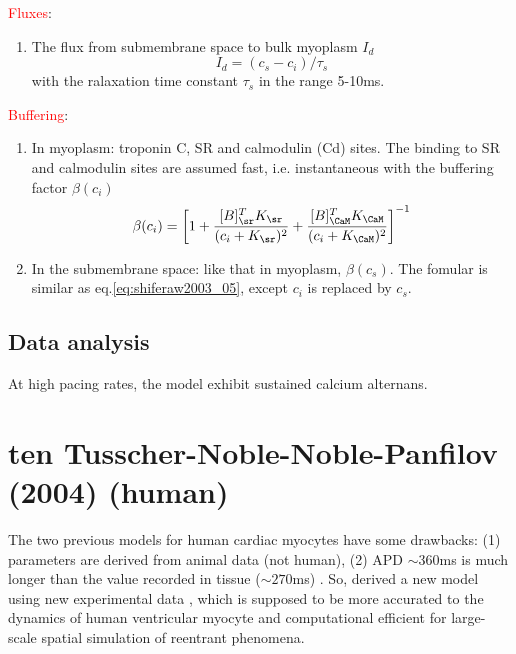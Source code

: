 \textcolor{red}{Fluxes}:
\begin{enumerate}
  \item The flux from submembrane space to bulk myoplasm $I_d$
  \begin{equation}
  I_d = (c_s-c_i)/\tau_s
  \end{equation}
  with the ralaxation time constant $\tau_s$ in the range 5-10ms.
\end{enumerate}


\textcolor{red}{Buffering}:
\begin{enumerate}
  \item In myoplasm: troponin C, SR and calmodulin (Cd) sites. The binding to SR
  and calmodulin sites are assumed fast, i.e. instantaneous with the buffering
  factor $\beta(c_i)$
  \begin{equation}
  \beta(c_i) = \left[ 1 + \frac{[B]^T_\sr K_\sr}{(c_i + K_\sr)^2} +
  \frac{[B]^T_\CaM K_\CaM}{(c_i + K_\CaM)^2}  \right]^{-1}
  \label{eq:shiferaw2003_05}
  \end{equation}

  \item In the submembrane space: like that in myoplasm, $\beta(c_s)$. The
  fomular is similar as eq.\ref{eq:shiferaw2003_05}, except $c_i$ is replaced by
  $c_s$.
\end{enumerate}


\subsection{Data analysis}
\label{sec:shiferaw_dataanalysis}

At high pacing rates, the model exhibit sustained calcium alternans.


\section{ten Tusscher-Noble-Noble-Panfilov (2004) (human) }
\label{sec:tenTusscher2004_human}

The two previous models for human cardiac myocytes \citep{priebe1998,
bernus2002} have some drawbacks: (1) parameters are derived from animal data
(not human), (2) APD $\sim $360ms is much longer than the value recorded in
tissue ($\sim 270$ms) \citep{li1998}. So, \citep{tenTusscher2004} derived a new
model using new experimental data \citep{morgan1992}, which is supposed to be
more accurated to the dynamics of human ventricular myocyte and computational
efficient for large-scale spatial simulation of reentrant phenomena.


